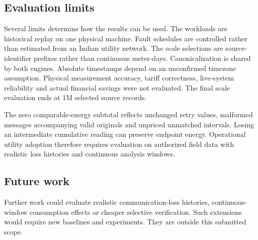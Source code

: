 \documentclass[11pt,a4paper]{article}
\begin{document}
\subsection{Evaluation limits}
Several limits determine how the results can be used. The workloads are historical replay on one physical machine. Fault schedules are controlled rather than estimated from an Indian utility network. The scale selections are source-identifier prefixes rather than continuous meter-days. Canonicalization is shared by both engines. Absolute timestamps depend on an unconfirmed timezone assumption. Physical measurement accuracy, tariff correctness, live-system reliability and actual financial savings were not evaluated. The final scale evaluation ends at 1M selected source records.

The zero comparable-energy subtotal reflects unchanged retry values, malformed messages accompanying valid originals and unpriced unmatched intervals. Losing an intermediate cumulative reading can preserve endpoint energy. Operational utility adoption therefore requires evaluation on authorized field data with realistic loss histories and continuous analysis windows.

\subsection{Future work}
Further work could evaluate realistic communication-loss histories, continuous-window consumption effects or cheaper selective verification. Such extensions would require new baselines and experiments. They are outside this submitted scope.
\end{document}
